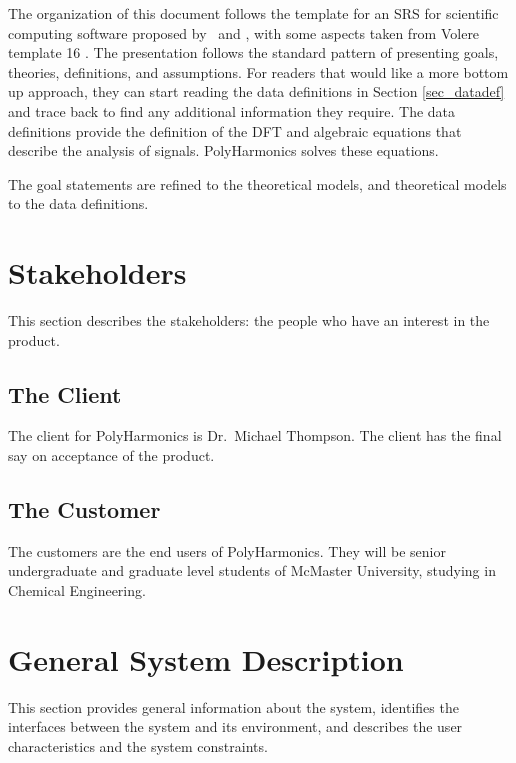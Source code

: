 \documentclass[12pt]{article}
\newcommand{\progname}{PolyHarmonics}
\begin{document}
The organization of this document follows the template for an SRS for scientific
computing software proposed by~\cite{Koothoor2013} and \cite{SmithAndLai2005},
with some aspects taken from Volere template 16 \cite{Volere}. The presentation 
follows the
standard pattern of presenting goals, theories, definitions, and assumptions.
For readers that would like a more bottom up approach, they can start reading
the data definitions in Section \ref{sec_datadef} and trace back to find any
additional information they require.  The data definitions provide the
definition of the DFT and algebraic equations that describe the analysis of
signals.  \progname{} solves these equations.

The goal statements are refined to the theoretical models, and theoretical
models to the data definitions.


\section{Stakeholders}

This section describes the stakeholders: the people who have an interest in the 
product.

\subsection{The Client}

The client for \progname{} is Dr.~Michael Thompson. The client has the final say
on acceptance of the product.

\subsection{The Customer}

The customers are the end users of \progname{}. They will be senior
undergraduate and graduate level students of McMaster University, studying in
Chemical Engineering.

\section{General System Description}

This section provides general information about the system,
identifies the interfaces between the system and its environment, and describes 
the
user characteristics and the system constraints.
\end{document}
